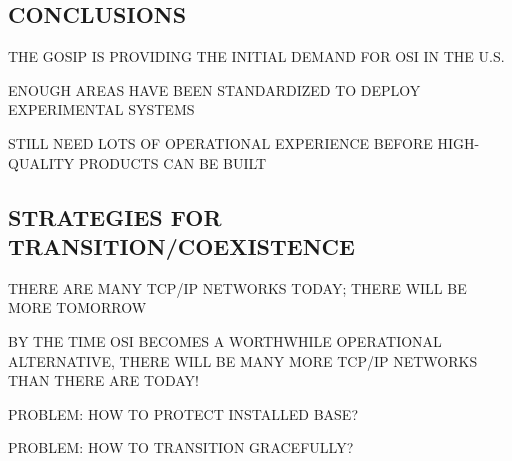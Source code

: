 \begin{bwslide}
\part*	{CONCLUSIONS}\bf

\begin{nrtc}
\item	THE GOSIP IS PROVIDING THE INITIAL DEMAND FOR OSI IN THE U.S.

\item	ENOUGH AREAS HAVE BEEN STANDARDIZED TO DEPLOY EXPERIMENTAL SYSTEMS

\item	STILL NEED LOTS OF OPERATIONAL EXPERIENCE BEFORE HIGH-QUALITY
	PRODUCTS CAN BE BUILT
\end{nrtc}
\end{bwslide}


\begin{bwslide}
\part	{STRATEGIES FOR TRANSITION/COEXISTENCE}\bf

\begin{nrtc}
\item	THERE ARE MANY TCP/IP NETWORKS TODAY; THERE WILL BE MORE TOMORROW

\item	BY THE TIME OSI BECOMES A WORTHWHILE OPERATIONAL ALTERNATIVE,
	THERE WILL BE MANY MORE TCP/IP NETWORKS THAN THERE ARE TODAY!

\item	PROBLEM: HOW TO PROTECT INSTALLED BASE?

\item	PROBLEM: HOW TO TRANSITION GRACEFULLY?
\end{nrtc}
\end{bwslide}


